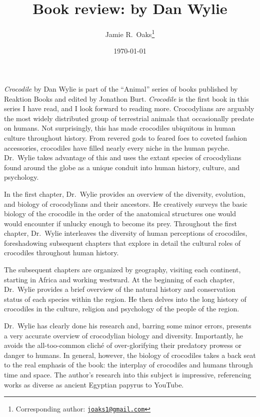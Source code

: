 \documentclass[letterpaper,12pt]{article}
\title{Book review: \croc by Dan Wylie}
\author[1]{Jamie R.\ Oaks\thanks{Corresponding author: \href{mailto:joaks1@gmail.com}{\tt joaks1@gmail.com}}}
\affil[1]{Department of Biology, University of Washington, Seattle, Washington 98195}
\date{\today}
\newcommand{\croc}{\emph{Crocodile}\xspace}
\begin{document}
\maketitle

\newpage
\doublespacing

\croc by Dan Wylie \citep{Wylie2013} is part of the ``Animal'' series of books
published by Reaktion Books and edited by Jonathon Burt.
\croc is the first book in this series I have read, and I look forward to
reading more.
Crocodylians are arguably the most widely distributed group of terrestrial
animals that occasionally predate on humans.
Not surprisingly, this has made crocodiles ubiquitous in human culture
throughout history.
From revered gods to feared foes to coveted fashion accessories, crocodiles
have filled nearly every niche in the human psyche.
Dr.\ Wylie takes advantage of this and uses the extant species of crocodylians
found around the globe as a unique conduit into human history, culture, and
psychology.

In the first chapter, Dr.\ Wylie provides an overview of the diversity,
evolution, and biology of crocodylians and their ancestors.
He creatively surveys the basic biology of the crocodile in the order of the
anatomical structures one would would encounter if unlucky enough to become its
prey.
Throughout the first chapter, Dr.\ Wylie interleaves the diversity of human
perceptions of crocodiles, foreshadowing subsequent chapters that explore in
detail the cultural roles of crocodiles throughout human history.

The subsequent chapters are organized by geography, visiting each continent,
starting in Africa and working westward.
At the beginning of each chapter, Dr.\ Wylie provides a brief overview of the
natural history and conservation status of each species within the region.
He then delves into the long history of crocodiles in the culture, religion and
psychology of the people of the region.

Dr.\ Wylie has clearly done his research and, barring some minor errors,
presents a very accurate overview of crocodylian biology and diversity.
Importantly, he avoids the all-too-common clich\'e of over-glorifying their
predatory prowess or danger to humans.
In general, however, the biology of crocodiles takes a back seat to the real
emphasis of the book: the interplay of crocodiles and humans through time and
space.
The author's research into this subject is impressive, referencing works as
diverse as ancient Egyptian papyrus to YouTube.
\end{document}

